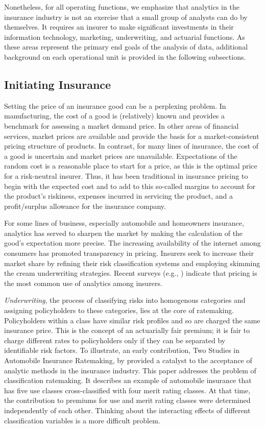 \documentclass[]{book}
\begin{document}
Nonetheless, for all operating functions, we emphasize that analytics in
the insurance industry is not an exercise that a small group of analysts
can do by themselves. It requires an insurer to make significant
investments in their information technology, marketing, underwriting,
and actuarial functions. As these areas represent the primary end goals
of the analysis of data, additional background on each operational unit
is provided in the following subsections.

\subsection{Initiating Insurance}\label{initiating-insurance}

Setting the price of an insurance good can be a perplexing problem. In
manufacturing, the cost of a good is (relatively) known and provides a
benchmark for assessing a market demand price. In other areas of
financial services, market prices are available and provide the basis
for a market-consistent pricing structure of products. In contrast, for
many lines of insurance, the cost of a good is uncertain and market
prices are unavailable. Expectations of the random cost is a reasonable
place to start for a price, as this is the optimal price for a
risk-neutral insurer. Thus, it has been traditional in insurance pricing
to begin with the expected cost and to add to this so-called margins to
account for the product's riskiness, expenses incurred in servicing the
product, and a profit/surplus allowance for the insurance company.

For some lines of business, especially automobile and homeowners
insurance, analytics has served to sharpen the market by making the
calculation of the good's expectation more precise. The increasing
availability of the internet among consumers has promoted transparency
in pricing. Insurers seek to increase their market share by refining
their risk classification systems and employing skimming the cream
underwriting strategies. Recent surveys (e.g., \citep{survey2013})
indicate that pricing is the most common use of analytics among
insurers.

\emph{Underwriting}, the process of classifying risks into homogenous
categories and assigning policyholders to these categories, lies at the
core of ratemaking. Policyholders within a class have similar risk
profiles and so are charged the same insurance price. This is the
concept of an actuarially fair premium; it is fair to charge different
rates to policyholders only if they can be separated by identifiable
risk factors. To illustrate, an early contribution, Two Studies in
Automobile Insurance Ratemaking, by \citep{bailey1960} provided a
catalyst to the acceptance of analytic methods in the insurance
industry. This paper addresses the problem of classification ratemaking.
It describes an example of automobile insurance that has five use
classes cross-classified with four merit rating classes. At that time,
the contribution to premiums for use and merit rating classes were
determined independently of each other. Thinking about the interacting
effects of different classification variables is a more difficult
problem.
\end{document}
